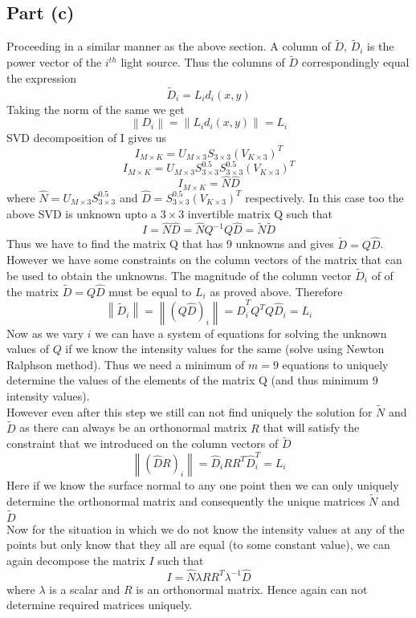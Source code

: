 \documentclass{article}
\newcommand\norm[1]{\left\lVert#1\right\rVert}
\begin{document}
\subsection*{Part (c)}
Proceeding in a similar manner as the above section.
A column of $\tilde{D}$, $\tilde{D}_i$ is the power vector of the $i^{th}$ light source.
Thus the columns of $\tilde{D}$ correspondingly equal the expression
$$ \tilde{D}_i = L_i d_i(x,y) $$
Taking the norm of the same we get
$$ \norm{D_i} = \norm{L_i d_i(x,y)} = L_i $$
SVD decomposition of I gives us
$$ I_{M \times K} = U_{M \times 3} S_{3 \times 3} (V_{K \times 3})^T $$
$$ I_{M \times K} = U_{M \times 3} S^0.5_{3 \times 3} S^0.5_{3 \times 3} (V_{K \times 3})^T $$
$$ I_{M \times K} = \hat{N} \hat{D} $$
where $\hat{N} = U_{M \times 3} S^0.5_{3 \times 3}$ and $\hat{D} = S^0.5_{3 \times 3} (V_{K \times 3})^T$ respectively. In this case too the above SVD is unknown upto a $3 \times 3$ invertible matrix Q such that
$$ I = \hat{N}\hat{D} = \hat{N} Q^{-1} Q \hat{D} = \tilde{N}\tilde{D} $$
Thus we have to find the matrix Q that has 9 unknowns and gives $\tilde{D} = Q \hat{D}$. \\
However we have some constraints on the column vectors of the matrix that can be used to obtain the unknowns. The magnitude of the column vector $\tilde{D}_i$ of of the matrix $\tilde{D} = Q \hat{D}$ must be equal to $L_i$ as proved above. Therefore 
$$ \norm{\tilde{D}_i} = \norm{(Q \hat{D})_i} = \hat{D}^T_i Q^T Q \hat{D}_i = L_i $$
Now as we vary $i$ we can have a system of equations for solving the unknown values of $Q$ if we know the intensity values for the same (solve using Newton Ralphson method). Thus we need a minimum of $m = 9$ equations to uniquely determine the values of the elements of the matrix Q (and thus minimum 9 intensity values).\\

However even after this step we still can not find uniquely the solution for $\tilde{N}$ and $\tilde{D}$ as there can always be an orthonormal matrix $R$ that will satisfy the constraint that we introduced on the column vectors of $\tilde{D}$
$$ \norm{(\hat{D}R)_i} = \hat{D}_i R R^T \hat{D}^T_i = L_i $$
Here if we know the surface normal to any one point then we can only uniquely determine the orthonormal matrix and consequently the unique matrices $\tilde{N}$ and $\tilde{D}$\\
Now for the situation in which we do not know the intensity values at any of the points but only know that they all are equal (to some constant value), we can again decompose the matrix $I$ such that 
$$ I = \hat{N} \lambda R R^T \lambda^{-1} \hat{D} $$
where $\lambda$ is a scalar and $R$ is an orthonormal matrix. Hence again can not determine required matrices uniquely.
\end{document}
